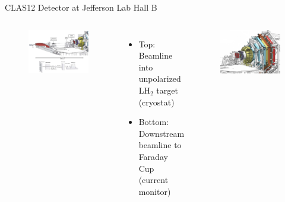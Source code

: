 \documentclass[aspectratio=169]{beamer}
\begin{document}
\begin{frame}{CLAS12 Detector at Jefferson Lab Hall B} 
        \vspace{-0.5cm}
        \begin{columns}[t, onlytextwidth]
                \begin{figure}[t!]
                    \includegraphics[width=.86349\textwidth]{Main/beamline.png}
                    
                    
                \end{figure}
                \vspace{-0.45cm}
                  \begin{itemize}
                    \setlength\itemsep{1em}
                    \item  Top: Beamline into unpolarized LH$_2$ target (cryostat)
                    \item Bottom: Downstream beamline to Faraday Cup (current monitor)
                    \end{itemize}
                    
                \begin{figure}[t!]
                    \includegraphics[width=.8565899\textwidth]{DNP/CLASdetector.jpg}
                    

\end{figure}
\end{columns}
\end{frame}
\end{document}
